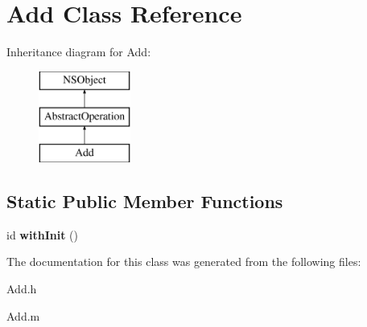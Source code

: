 \hypertarget{interface_add}{
\section{\-Add \-Class \-Reference}
\label{interface_add}
}
\-Inheritance diagram for \-Add\-:\begin{figure}[H]
\begin{center}
\leavevmode
\includegraphics[height=3.000000cm]{interface_add}
\end{center}
\end{figure}
\subsection*{\-Static \-Public \-Member \-Functions}
\begin{DoxyCompactItemize}
\item 
\hypertarget{interface_add_add4b68d47f5f4e315e737cf225b6fd75}{
id {\bfseries with\-Init} ()}
\label{interface_add_add4b68d47f5f4e315e737cf225b6fd75}

\end{DoxyCompactItemize}


\-The documentation for this class was generated from the following files\-:\begin{DoxyCompactItemize}
\item 
\-Add.\-h\item 
\-Add.\-m\end{DoxyCompactItemize}
